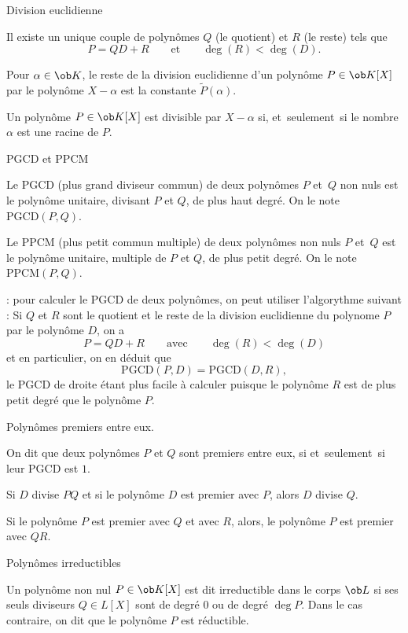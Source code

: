 \Concept [] Division euclidienne

\Theoreme [Title=Division euclidienne;$P$ et $D\neq0$ polynômes à coefficients dans $\ob K$]
Il existe un unique couple de polynômes $Q$ (le quotient) et $R$ (le reste) tels que 
$$
P=QD+R\qquad \mbox{et}\qquad\deg(R)<\deg(D).
$$

\Propriete []  Pour $\alpha\in\ob K$, le reste de la division euclidienne d'un polynôme $P\in\ob K[X]$ par le polynôme $X-\alpha$ est la constante $\tilde P(\alpha)$. 
\bigskip

\Propriete []  Un polynôme $P\in\ob K[X]$ est divisible par $X-\alpha$ si, et~seulement~si le nombre $\alpha$ est une racine de $P$. 
\bigskip

\Concept [] PGCD et PPCM

\Definition []  Le PGCD (plus grand diviseur commun) de deux polynômes $P$ et~$Q$ non nuls est le polynôme unitaire, 
divisant $P$ et $Q$, de plus haut degré. On le note $\mbox{PGCD}(P,Q)$. 
\bigskip

\Definition []  Le PPCM (plus petit commun multiple) de deux polynômes non nuls $P$ et~$Q$ est le polynôme unitaire, multiple 
de $P$ et $Q$, de plus petit degré. On le note $\mbox{PPCM}(P,Q)$. 
\bigskip

 : pour calculer le PGCD de deux polynômes, on peut utiliser l'algorythme suivant : 
Si $Q$ et $R$ sont le quotient et le reste de la division euclidienne du polynome $P$ par le polynôme $D$, on a 
$$
P=QD+R\qquad\mbox{avec}\qquad\deg(R)< \deg(D)
$$
et en particulier, on en déduit que 
$$
\mbox{PGCD}(P,D)=\mbox{PGCD}(D,R),
$$
le PGCD de droite étant plus facile à calculer puisque le polynôme $R$ est de plus petit degré que le polynôme $P$. 
\bigskip

\Concept [] Polynômes premiers entre eux. 

\Definition []  On dit que deux polynômes $P$ et $Q$ sont premiers entre eux, si et~seulement~si leur PGCD est $1$. 
\bigskip

\Theoreme [Title=Théorème de Gauss;$P$ et $Q$ deux polynômes non nul] 
Si $D$ divise $PQ$ et si le polynôme $D$ est premier avec $P$, alors $D$ divise $Q$. 
\bigskip
  
\Propriete []  Si le polynôme $P$ est premier avec $Q$ et avec $R$, alors, le polynôme $P$ est premier avec $QR$. 
\bigskip

\Concept [] Polynômes irreductibles

\Definition []  Un polynôme non nul $P\in\ob K[X]$ est dit irreductible dans le corps $\ob L$ si ses seuls diviseurs $Q\in L[X]$ sont de degré $0$ 
ou de degré $\deg P$. Dans le cas contraire, on dit que le polynôme $P$ est réductible. 
\bigskip

